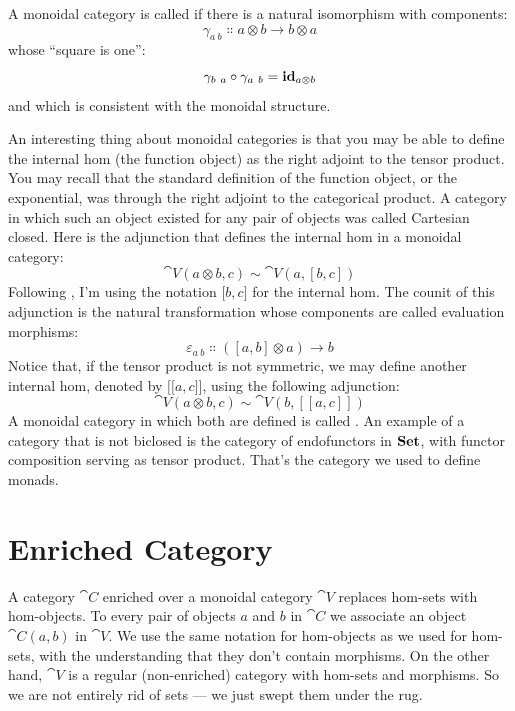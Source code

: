 \begin{figure}[H]
\centering
{}
\end{figure}

\noindent
A monoidal category is called  if there is a natural
isomorphism with components:
\[\gamma_{a\ b} \Colon a \otimes b \to b \otimes a\]
whose ``square is one'':
\[\gamma_{b\ a} \circ \gamma_{a\ b} = \idarrow[a \otimes b]\]
and which is consistent with the monoidal structure.

An interesting thing about monoidal categories is that you may be able
to define the internal hom (the function object) as the right adjoint to
the tensor product. You may recall that the standard definition of the
function object, or the exponential, was through the right adjoint to
the categorical product. A category in which such an object existed for
any pair of objects was called Cartesian closed. Here is the adjunction
that defines the internal hom in a monoidal category:
\[\cat{V}(a \otimes b, c) \sim \cat{V}(a, [b, c])\]
Following
, I'm using the notation ${[}b, c{]}$ for the internal
hom. The counit of this adjunction is the natural transformation whose
components are called evaluation morphisms:
\[\varepsilon_{a\ b} \Colon ([a, b] \otimes a) \to b\]
Notice that, if the tensor product is not symmetric, we may define
another internal hom, denoted by ${[}{[}a, c{]}{]}$, using the
following adjunction:
\[\cat{V}(a \otimes b, c) \sim \cat{V}(b, [[a, c]])\]
A monoidal category in which both are defined is called . An
example of a category that is not biclosed is the category of
endofunctors in $\Set$, with functor composition serving as tensor
product. That's the category we used to define monads.

\section{Enriched Category}

A category $\cat{C}$ enriched over a monoidal category $\cat{V}$ replaces
hom-sets with hom-objects. To every pair of objects $a$ and
$b$ in $\cat{C}$ we associate an object $\cat{C}(a, b)$ in
$\cat{V}$. We use the same notation for hom-objects as we used for
hom-sets, with the understanding that they don't contain morphisms. On
the other hand, $\cat{V}$ is a regular (non-enriched) category with
hom-sets and morphisms. So we are not entirely rid of sets --- we just
swept them under the rug.

